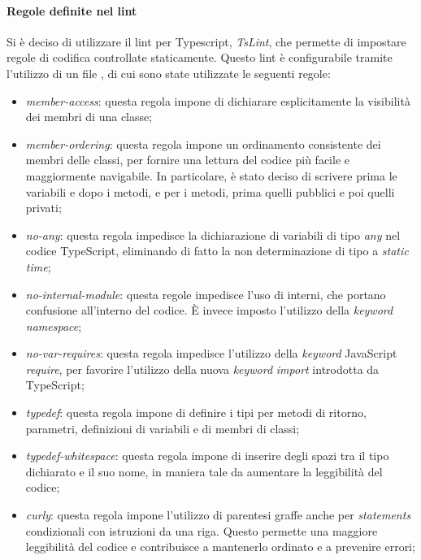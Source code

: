                 \paragraph*{Regole definite nel lint}
                Si \`e deciso di utilizzare il lint per Typescript, \textit{TsLint}, che permette di impostare regole di codifica controllate staticamente.
                Questo lint \`e configurabile tramite l'utilizzo di un file , di cui sono state utilizzate le seguenti regole:
                \begin{itemize}

                \item \textit{member-access}: questa regola impone di dichiarare esplicitamente la visibilit\`a dei membri di una classe;
                \item \textit{member-ordering}: questa regola impone un ordinamento consistente dei membri delle classi, per fornire una lettura del codice pi\`u facile e maggiormente navigabile. In particolare, \`e stato deciso di scrivere prima le variabili e dopo i metodi, e per i metodi, prima quelli pubblici e poi quelli privati;
                \item \textit{no-any}: questa regola impedisce la dichiarazione di variabili di tipo \textit{any} nel codice TypeScript, eliminando di fatto la non determinazione di tipo a \textit{static time};
                \item \textit{no-internal-module}: questa regole impedisce l'uso di  interni, che portano confusione all'interno del codice. \`E invece imposto l'utilizzo della \textit{keyword} \textit{namespace};
                \item \textit{no-var-requires}: questa regola impedisce l'utilizzo della \textit{keyword} JavaScript \textit{require}, per favorire l'utilizzo della nuova \textit{keyword} \textit{import} introdotta da TypeScript;
                \item \textit{typedef}: questa regola impone di definire i tipi per metodi di ritorno, parametri, definizioni di variabili e di membri di classi;
                \item \textit{typedef-whitespace}: questa regola impone di inserire degli spazi tra il tipo dichiarato e il suo nome, in maniera tale da aumentare la leggibilit\`a del codice;
                \item \textit{curly}: questa regola impone l'utilizzo di parentesi graffe anche per \textit{statements} condizionali con istruzioni da una riga. Questo permette una maggiore leggibilit\`a del codice e contribuisce a mantenerlo ordinato e a prevenire errori;

\end{itemize}
